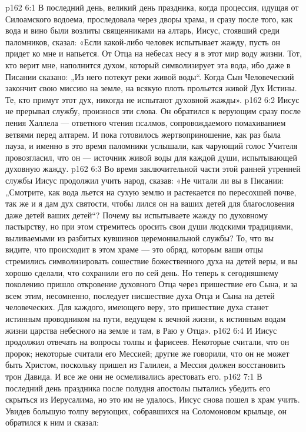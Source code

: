 \vs p162 6:1 В последний день, великий день праздника, когда процессия, идущая от Силоамского водоема, проследовала через дворы храма, и сразу после того, как вода и вино были возлиты священниками на алтарь, Иисус, стоявший среди паломников, сказал: «Если какой\hyp{}либо человек испытывает жажду, пусть он придет ко мне и напьется. От Отца на небесах несу я в этот мир воду жизни. Тот, кто верит мне, наполнится духом, который символизирует эта вода, ибо даже в Писании сказано: „Из него потекут реки живой воды“. Когда Сын Человеческий закончит свою миссию на земле, на всякую плоть прольется живой Дух Истины. Те, кто примут этот дух, никогда не испытают духовной жажды».
\vs p162 6:2 Иисус не прерывал службу, произнося эти слова. Он обратился к верующим сразу после пения Халлела --- ответного чтения псалмов, сопровождаемого помахиванием ветвями перед алтарем. И пока готовилось жертвоприношение, как раз была пауза, и именно в это время паломники услышали, как чарующий голос Учителя провозгласил, что он --- источник живой воды для каждой души, испытывающей духовную жажду.
\vs p162 6:3 Во время заключительной части этой ранней утренней службы Иисус продолжил учить народ, сказав: «Не читали ли вы в Писании: „Смотрите, как вода льется на сухую землю и растекается по пересохшей почве, так же и я дам дух святости, чтобы лился он на ваших детей для благословения даже детей ваших детей“? Почему вы испытываете жажду по духовному пастырству, но при этом стремитесь оросить свои души людскими традициями, выливаемыми из разбитых кувшинов церемониальной службы? То, что вы видите, что происходит в этом храме --- это обряд, которым ваши отцы стремились символизировать сошествие божественного духа на детей веры, и вы хорошо сделали, что сохранили его по сей день. Но теперь к сегодняшнему поколению пришло откровение духовного Отца через пришествие его Сына, и за всем этим, несомненно, последует нисшествие духа Отца и Сына на детей человеческих. Для каждого, имеющего веру, это пришествие духа станет истинным проводником на пути, ведущем к вечной жизни, к истинным водам жизни царства небесного на земле и там, в Раю у Отца».
\vs p162 6:4 И Иисус продолжил отвечать на вопросы толпы и фарисеев. Некоторые считали, что он пророк; некоторые считали его Мессией; другие же говорили, что он не может быть Христом, поскольку пришел из Галилеи, а Мессия должен восстановить трон Давида. И все же они не осмеливались арестовать его.
\vs p162 7:1 В последний день праздника после полудня апостолы пытались убедить его скрыться из Иерусалима, но это им не удалось, Иисус снова пошел в храм учить. Увидев большую толпу верующих, собравшихся на Соломоновом крыльце, он обратился к ним и сказал:
